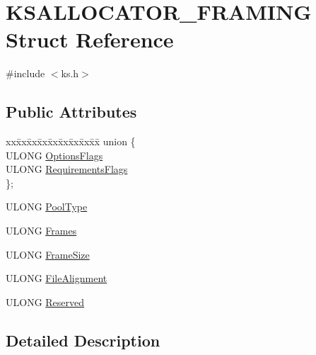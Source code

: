 \hypertarget{struct_k_s_a_l_l_o_c_a_t_o_r___f_r_a_m_i_n_g}{}\section{K\+S\+A\+L\+L\+O\+C\+A\+T\+O\+R\+\_\+\+F\+R\+A\+M\+I\+NG Struct Reference}
\label{struct_k_s_a_l_l_o_c_a_t_o_r___f_r_a_m_i_n_g}


{\ttfamily \#include $<$ks.\+h$>$}

\subsection*{Public Attributes}
\begin{DoxyCompactItemize}
\item 
\begin{tabbing}
xx\=xx\=xx\=xx\=xx\=xx\=xx\=xx\=xx\=\kill
union \{\\
\>ULONG \hyperlink{struct_k_s_a_l_l_o_c_a_t_o_r___f_r_a_m_i_n_g_a5c3aa608ff8a359feea250311c1f35b0}{OptionsFlags}\\
\>ULONG \hyperlink{struct_k_s_a_l_l_o_c_a_t_o_r___f_r_a_m_i_n_g_a171535e1d4022c72ca0a857efac094d6}{RequirementsFlags}\\
\}; \\

\end{tabbing}\item 
U\+L\+O\+NG \hyperlink{struct_k_s_a_l_l_o_c_a_t_o_r___f_r_a_m_i_n_g_a01b76130facc528cfb7319c9b6f938f4}{Pool\+Type}
\item 
U\+L\+O\+NG \hyperlink{struct_k_s_a_l_l_o_c_a_t_o_r___f_r_a_m_i_n_g_aa25e20017444ced6d4d6fe1e4279ffb4}{Frames}
\item 
U\+L\+O\+NG \hyperlink{struct_k_s_a_l_l_o_c_a_t_o_r___f_r_a_m_i_n_g_afdba87342998933c95bde99a49d44766}{Frame\+Size}
\item 
U\+L\+O\+NG \hyperlink{struct_k_s_a_l_l_o_c_a_t_o_r___f_r_a_m_i_n_g_ae0f7fcded8d4244e4287f9d90fa9f34c}{File\+Alignment}
\item 
U\+L\+O\+NG \hyperlink{struct_k_s_a_l_l_o_c_a_t_o_r___f_r_a_m_i_n_g_a55979a49c3e1b4e3cd5936a1b51e056e}{Reserved}
\end{DoxyCompactItemize}


\subsection{Detailed Description}


